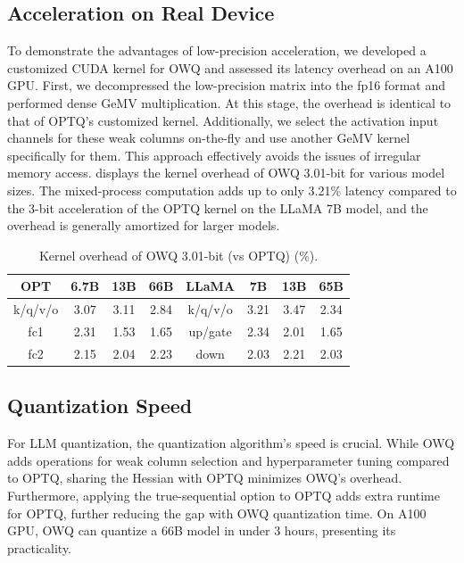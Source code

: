 \documentclass[letterpaper]{article} %
\begin{document}
\subsection{Acceleration on Real Device}\label{sec:accel}
To demonstrate the advantages of low-precision acceleration, we developed a customized CUDA kernel for OWQ and assessed its latency overhead on an A100 GPU. First, we decompressed the low-precision matrix into the fp16 format and performed dense GeMV multiplication. At this stage, the overhead is identical to that of OPTQ's customized kernel. Additionally, we select the activation input channels for these weak columns on-the-fly and use another GeMV kernel specifically for them. This approach effectively avoids the issues of irregular memory access.  displays the kernel overhead of OWQ 3.01-bit for various model sizes. The mixed-process computation adds up to only 3.21\% latency compared to the 3-bit acceleration of the OPTQ kernel on the LLaMA 7B model, and the overhead is generally amortized for larger models.

\begin{table}
        \centering        
        \small
        \begin{tabular}{ c | c @{\hskip 0.12in} c @{\hskip 0.12in} c | c | c @{\hskip 0.12in} c @{\hskip 0.12in} c }
            \toprule
            OPT & 6.7B & 13B & 66B & LLaMA & 7B & 13B & 65B \\
            \midrule
            k/q/v/o & 3.07 & 3.11 & 2.84 & k/q/v/o & 3.21 & 3.47 & 2.34 \\
            fc1 & 2.31 & 1.53 & 1.65 & up/gate & 2.34 & 2.01 & 1.65 \\
            fc2 & 2.15 & 2.04 & 2.23 & down & 2.03 & 2.21 & 2.03 \\
            \bottomrule
        \end{tabular}
        \caption{Kernel overhead of OWQ 3.01-bit (vs OPTQ) (\%).}
        \label{table:kernel_overhead}
\end{table}


\subsection{Quantization Speed}

For LLM quantization, the quantization algorithm's speed is crucial. While OWQ adds operations for weak column selection and hyperparameter tuning compared to OPTQ, sharing the Hessian with OPTQ minimizes OWQ's overhead. Furthermore, applying the true-sequential option to OPTQ adds extra runtime for OPTQ, further reducing the gap with OWQ quantization time. On A100 GPU, OWQ can quantize a 66B model in under 3 hours, presenting its practicality.
\end{document}
